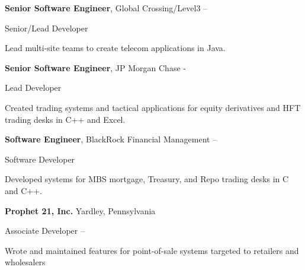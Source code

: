 \documentclass[MMMMyyyy,nonstopmode]{simpleresumecv_stacked}
\newif\ifLOCATION
\begin{document}
\begin{Body}
\Entry
\textbf{Senior Software Engineer}, Global Crossing/Level3
\hfill 
 -- 

Senior/Lead Developer
\ifLOCATION
\hfill
Rochester, New York
\fi

\begin{Detail}
Lead multi-site teams to create telecom applications in Java.

\end{Detail}

\Gap
\Entry
\textbf{Senior Software Engineer}, JP Morgan Chase
\hfill 
 - 

Lead Developer
\ifLOCATION
\hfill
New York, New York
\fi

\begin{Detail}
Created trading systems and tactical applications for equity derivatives and HFT trading desks in C++ and Excel.

\end{Detail}

\Entry
\textbf{Software Engineer}, BlackRock Financial Management
\hfill 
 --  

Software Developer
\ifLOCATION
\hfill
New York, New York
\fi

\begin{Detail}
Developed systems for MBS mortgage, Treasury, and Repo trading desks in C and C++.
\end{Detail}

\iffalse
\BigGap
\Entry
\textbf{Prophet 21, Inc.}
\hfill 
Yardley, Pennsylvania

Associate Developer
\hfill
{} --  

\begin{Detail}
\BulletItem
Wrote and maintained features for point-of-sale systems targeted to retailers and wholesalers


\end{Detail}
\end{Body}
\end{document}
